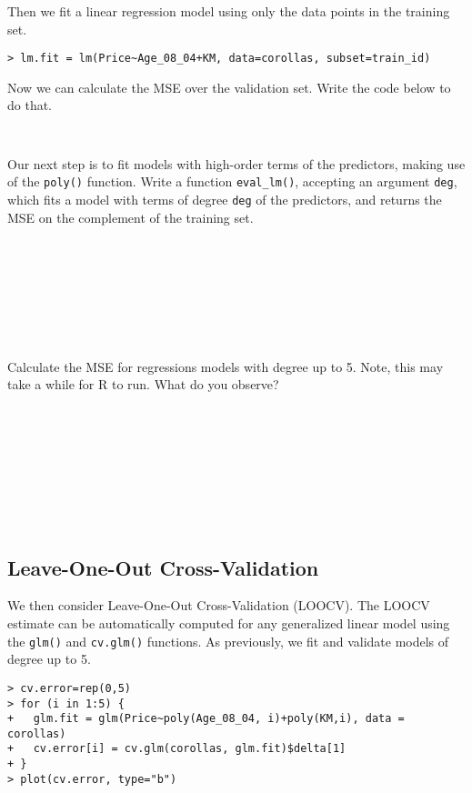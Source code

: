 \documentclass{article}
\begin{document}
Then we fit a linear regression model using only the data points in the training set.
\begin{Verbatim}[frame=single]
> lm.fit = lm(Price~Age_08_04+KM, data=corollas, subset=train_id)
\end{Verbatim}

Now we can calculate the MSE over the validation set. Write the code below to do that.
\begin{Verbatim}[frame=single]


\end{Verbatim}

Our next step is to fit models with high-order terms of the
predictors, making use of the \texttt{poly()} function. Write a function
\texttt{eval\_lm()}, accepting an argument \texttt{deg},
which fits a model with terms of degree \texttt{deg} of the predictors, and
returns the MSE on the complement of the training set.


\begin{Verbatim}[frame=single]








\end{Verbatim}


Calculate the MSE for regressions models with degree up to 5. Note, this may take a while for R to run. What do you
observe?


\begin{Verbatim}[frame=single]









\end{Verbatim}

\bigskip

\subsection*{Leave-One-Out Cross-Validation}

We then consider Leave-One-Out Cross-Validation (LOOCV). The LOOCV estimate can
be automatically computed for any generalized linear model using the
\texttt{glm()} and \texttt{cv.glm()} functions. As previously, we fit and
validate models of degree up to 5.
\begin{Verbatim}[frame=single]
> cv.error=rep(0,5)
> for (i in 1:5) {
+   glm.fit = glm(Price~poly(Age_08_04, i)+poly(KM,i), data = corollas)
+   cv.error[i] = cv.glm(corollas, glm.fit)$delta[1]
+ }
> plot(cv.error, type="b")
\end{Verbatim}
\end{document}

